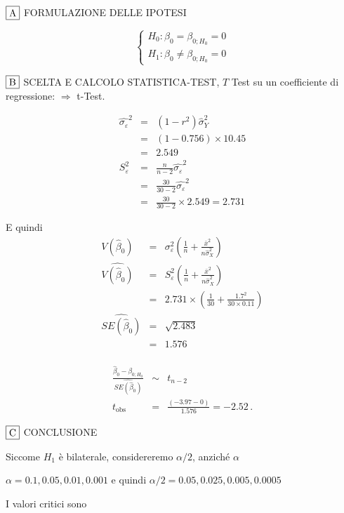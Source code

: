 \documentclass[
  11pt,
]{book}
\theoremstyle{mytheoremstyle}
\theoremstyle{mydefstyle}
\newenvironment{sol}
  {
  \begin{tcolorbox}[enhanced,breakable,arc=0.1mm,boxrule=1pt,colback=white,colframe=iblue,
  title=\bf \fontfamily{lmss}\selectfont \hspace{.5 cm} Soluzione,drop fuzzy shadow]

}{
\end{tcolorbox}
  }
\begin{document}
\begin{sol}
\(\fbox{A}\) FORMULAZIONE DELLE IPOTESI

\[\begin{cases}
   H_0: \beta_0 = \beta_{0;H_0}=0 \\
   H_1: \beta_0 \neq \beta_{0;H_0}=0 
   \end{cases}\]

\(\fbox{B}\) SCELTA E CALCOLO STATISTICA-TEST, \(T\)
Test su un coefficiente di regressione: \(\Rightarrow\) t-Test.

\begin{eqnarray*}
\hat{\sigma_\varepsilon}^2&=&(1-r^2)\hat\sigma_Y^2\\
&=& (1- 0.756 )\times 10.45 \\
   &=&  2.549 \\
   S_\varepsilon^2 &=& \frac{n} {n-2} \hat{\sigma_\varepsilon}^2\\
   &=&  \frac{ 30 } { 30 -2} \hat{\sigma_\varepsilon}^2 \\
 &=&  \frac{ 30 } { 30 -2} \times  2.549  =  2.731  
\end{eqnarray*}

E quindi\begin{eqnarray*}
V(\hat\beta_{0}) &=& \sigma_{\varepsilon}^{2} \left( \frac{1} {n}  +  \frac{\bar{x}^{2}} {n \hat{\sigma}^{2}_{X}} \right)\\
\widehat{V(\hat\beta_{0})} &=& S_{\varepsilon}^{2}\left( \frac{1} {n}  +  \frac{\bar{x}^{2}} {n \hat{\sigma}^{2}_{X}} \right)\ \\
 &=&  2.731 \times\left( \frac{1} { 30 }  +  \frac{ 1.7 ^{2}} { 30 \times  0.11 } \right)\\
 \widehat{SE(\hat\beta_{0})}        &=&  \sqrt{ 2.483 }\\
 &=&  1.576 
\end{eqnarray*}\\
\begin{eqnarray*}
 \frac{\hat\beta_{ 0 } - \beta_{ 0 ;H_0}} {\widehat{SE(\hat\beta_{ 0 })}}&\sim&t_{n-2}\\
   t_{\text{obs}}
&=& \frac{ ( -3.97 -  0 )} { 1.576 }
 =   -2.52 \, .
\end{eqnarray*}

\(\fbox{C}\) CONCLUSIONE

Siccome \(H_1\) è bilaterale, considereremo \(\alpha/2\),
anziché \(\alpha\)

\(\alpha=0.1, 0.05, 0.01, 0.001\) e quindi \(\alpha/2=0.05, 0.025, 0.005, 0.0005\)

I valori critici sono


\end{sol}
\end{document}
